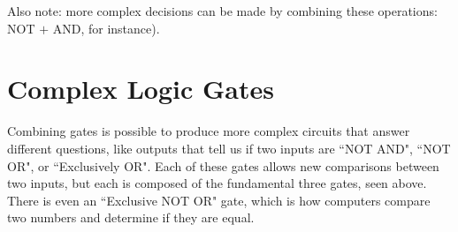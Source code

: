 Also note: more complex decisions can be made by combining these operations: NOT $+$ AND, for instance).


\clearpage
\newpage


\clearpage
\newpage


\clearpage
\newpage


\clearpage
\newpage

\section{Complex Logic Gates}

Combining gates is possible to produce more complex circuits that answer different questions, like outputs that tell us if two inputs are ``NOT AND", ``NOT OR", or ``Exclusively OR". Each of these gates allows new comparisons between two inputs, but each is composed of the fundamental three gates, seen above. There is even an ``Exclusive NOT OR" gate, which is how computers compare two numbers and determine if they are equal.



\clearpage
\newpage


\clearpage
\newpage


\clearpage
